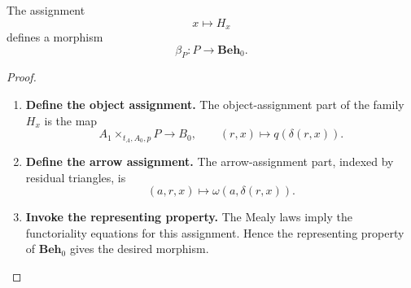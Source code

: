 \begin{lemma}
\label{lem:internal-construction-beta}
    The assignment
    \[
        x\longmapsto H_x
    \]
    defines a morphism
    \[
        \beta_P:P\to\mathbf{Beh}_0.
    \]
\end{lemma}
\begin{proof}
    \leavevmode
    \begin{enumerate}
        \item \textbf{Define the object assignment.} The object-assignment part of the family \(H_x\) is the map
        \[
            A_1\times_{t_A,A_0,p}P\to B_0,
            \qquad
            (r,x)\longmapsto q(\delta(r,x)).
        \]

        \item \textbf{Define the arrow assignment.} The arrow-assignment part, indexed by residual triangles, is
        \[
            (a,r,x)\longmapsto\omega(a,\delta(r,x)).
        \]

        \item \textbf{Invoke the representing property.} The Mealy laws imply the functoriality equations for this assignment. Hence the representing property of \(\mathbf{Beh}_0\) gives the desired morphism.
    \end{enumerate}
\end{proof}

